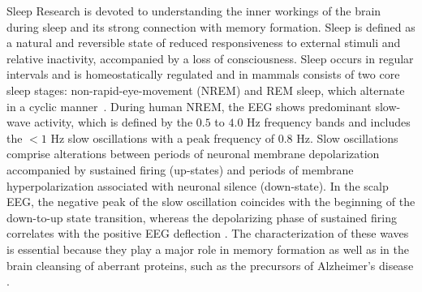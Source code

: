 \documentclass[review]{elsarticle}
\begin{document}
Sleep Research is devoted to understanding the inner workings of the brain during sleep and its strong connection with memory formation.  Sleep is defined as a natural and reversible state of reduced responsiveness to external stimuli and relative inactivity, accompanied by a loss of consciousness. Sleep occurs in regular intervals and is homeostatically regulated and in mammals consists of two core sleep stages: non-rapid-eye-movement (NREM) and REM sleep, which alternate in a cyclic manner~\cite{RB,AASM}. During human NREM, the EEG shows predominant slow-wave activity, which is defined by the $0.5$ to $4.0$ Hz frequency bands and includes the $<1$ Hz slow oscillations with a peak frequency of $0.8$ Hz.  Slow oscillations comprise alterations between periods of neuronal membrane depolarization accompanied by sustained firing (up-states) and periods of membrane hyperpolarization associated with neuronal silence (down-state). In the scalp EEG, the negative peak of the slow oscillation coincides with the beginning of the down-to-up state transition, whereas the depolarizing phase of sustained firing correlates with the positive EEG deflection \cite{RB, AASM}.
The characterization of these waves is essential because they play a major role in memory formation as well as in the brain cleansing of aberrant proteins, such as the precursors of Alzheimer's disease \cite{RB, AASM}.


\end{document}
